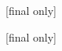 \chapter*{}

\vspace{2em}

\begin{savenotes}  %


  \setlength{\epigraphwidth}{30ex}

  \epigraph{
    [final only]
  }{
    [final only]
  }

\end{savenotes}